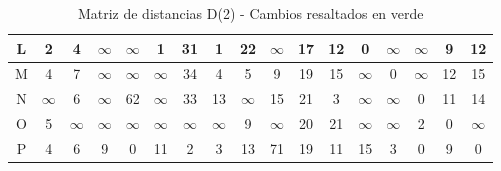 \documentclass[12pt]{article}
\begin{document}
\begin{table}[h!]
\begin{tabular}{|c|c|c|c|c|c|c|c|c|c|c|c|c|c|c|c|c|}
L & 2 & 4 & $\infty$ & $\infty$ & 1 & \cellcolor{lightgreen} 31 & 1 & 22 & $\infty$ & 17 & \cellcolor{lightgreen} 12 & 0 & $\infty$ & $\infty$ & \cellcolor{lightgreen} 9 & \cellcolor{lightgreen} 12 \\\hline
M & 4 & 7 & $\infty$ & $\infty$ & $\infty$ & \cellcolor{lightgreen} 34 & 4 & 5 & 9 & 19 & \cellcolor{lightgreen} 15 & $\infty$ & 0 & $\infty$ & \cellcolor{lightgreen} 12 & \cellcolor{lightgreen} 15 \\\hline
N & $\infty$ & 6 & $\infty$ & 62 & $\infty$ & \cellcolor{lightgreen} 33 & 13 & $\infty$ & 15 & 21 & 3 & $\infty$ & $\infty$ & 0 & \cellcolor{lightgreen} 11 & \cellcolor{lightgreen} 14 \\\hline
O & 5 & $\infty$ & $\infty$ & $\infty$ & $\infty$ & $\infty$ & $\infty$ & 9 & $\infty$ & 20 & 21 & $\infty$ & $\infty$ & 2 & 0 & $\infty$ \\\hline
P & 4 & 6 & 9 & 0 & 11 & 2 & 3 & 13 & 71 & 19 & 11 & 15 & 3 & 0 & 9 & 0 \\\hline
\end{tabular}
\caption{Matriz de distancias D(2) - Cambios resaltados en verde}
\end{table}
\end{document}
